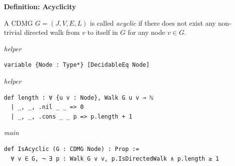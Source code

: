 \vspace{\appendixNotesGap}

\noindent\textbf{Definition: Acyclicity}\par\smallskip
{\appendixTexSize
    \label{def-acylic}
    A  CDMG  $G=(J,V,E,L)$  is called \emph{acyclic} if there does not exist
    any non-trivial directed walk from $v$ to itself in $G$ for any node $v \in G$.
\par}
\smallskip
{\small\textit{helper}}
\begin{verbatim}
variable {Node : Type*} [DecidableEq Node]
\end{verbatim}
{\small\textit{helper}}
\begin{verbatim}
def length : ∀ {u v : Node}, Walk G u v → ℕ
  | _, _, .nil _ _ => 0
  | _, _, .cons _ _ p => p.length + 1
\end{verbatim}
{\small\textit{main}}
\begin{verbatim}
def IsAcyclic (G : CDMG Node) : Prop :=
  ∀ v ∈ G, ¬ ∃ p : Walk G v v, p.IsDirectedWalk ∧ p.length ≥ 1
\end{verbatim}
~%

\vspace{\appendixNotesGap}

